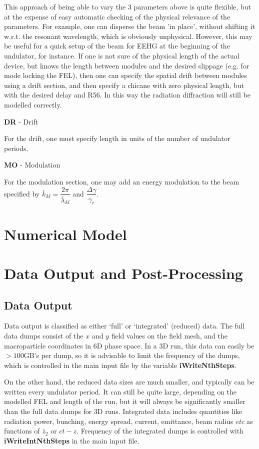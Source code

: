 \documentclass[12pt]{article}%
\begin{document}
This approach of being able to vary the 3 parameters above is quite flexible, but at the expense of easy automatic checking of the physical relevance of the parameters. For example, one can disperse the beam 'in place', without shifting it w.r.t. the resonant wavelength, which is obviously unphysical. However, this may be useful for a quick setup of the beam for EEHG at the beginning of the undulator, for instance. If one is not sure of the physical length of the actual device, but knows the length between modules and the desired slippage (e.g. for mode locking the FEL), then one can specify the spatial drift between modules using a drift section, and then specify a chicane with zero physical length, but with the desired delay and R56. In this way the radiation diffraction will still be modelled correctly.

{\bf DR} - Drift

For the drift, one must specify length in units of the number of undulator periods.

{\bf MO} - Modulation

For the modulation section, one may add an energy modulation to the beam specified by $\bar{k}_M = \dfrac{2 \pi}{\bar{\lambda}_M}$ and $\dfrac{\Delta \gamma}{\gamma_r}$.


\newpage

\section{Numerical Model}

\newpage

\section{Data Output and Post-Processing}

\subsection{Data Output}

Data output is classified as either `full' or `integrated' (reduced) data. The full data dumps consist of the $x$ and $y$ field values on the field mesh, and the macroparticle coordinates in 6D phase space. In a 3D run, this data can easily be $>100$GB's per dump, so it is advisable to limit the frequency of the dumps, which is controlled in the main input file by the variable {\bf iWriteNthSteps}.

On the other hand, the reduced data sizes are much smaller, and typically can be written every undulator period. It can still be quite large, depending on the modelled FEL and length of the run, but it will always be significantly smaller than the full data dumps for 3D runs. Integrated data includes quantities like radiation power, bunching, energy spread, current, emittance, beam radius \textit{etc} as functions of $\bar{z}_2$ or $ct-z$. Frequency of the integrated dumps is controlled with {\bf iWriteIntNthSteps} in the main input file.
\end{document}
